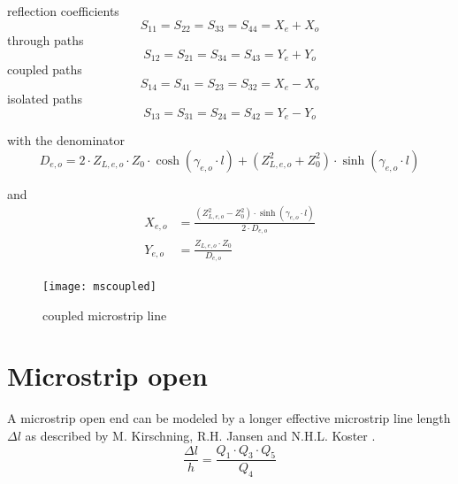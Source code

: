 \documentclass[10pt]{report}
\begin{document}
\addvspace{12pt}

reflection coefficients
\begin{equation}
S_{11} = S_{22} = S_{33} = S_{44} = X_e + X_o
\end{equation}
through paths
\begin{equation}
S_{12} = S_{21} = S_{34} = S_{43} = Y_e + Y_o
\end{equation}
coupled paths
\begin{equation}
S_{14} = S_{41} = S_{23} = S_{32} = X_e - X_o
\end{equation}
isolated paths
\begin{equation}
S_{13} = S_{31} = S_{24} = S_{42} = Y_e - Y_o
\end{equation}

with the denominator
\begin{equation}
D_{e,o} = 2\cdot Z_{L,e,o}\cdot Z_0\cdot \cosh(\gamma_{e,o}\cdot l)
         + \left(Z_{L,e,o}^2 + Z_0^2\right)\cdot \sinh\left(\gamma_{e,o}\cdot l\right)
\end{equation}

and
\begin{align}
X_{e,o} &= \frac{\left(Z_{L,e,o}^2 - Z_0^2\right)\cdot \sinh\left(\gamma_{e,o}\cdot l\right)}{2\cdot D_{e,o}}\\
Y_{e,o} &= \frac{Z_{L,e,o}\cdot Z_0}{D_{e,o}}
\end{align}

\begin{figure}[ht]
\begin{center}
\texttt{[image: mscoupled]}
\end{center}
\caption{coupled microstrip line}
\label{fig:mscoupled}
\end{figure}
\FloatBarrier

\section{Microstrip open}

A microstrip open end can be modeled by a longer effective microstrip
line length $\Delta l$ as described by M. Kirschning, R.H. Jansen and
N.H.L. Koster \cite{Kirschning7}.
\begin{equation}
\frac{\Delta l}{h} = \frac{Q_1\cdot Q_3\cdot Q_5}{Q_4}
\end{equation}
\end{document}
